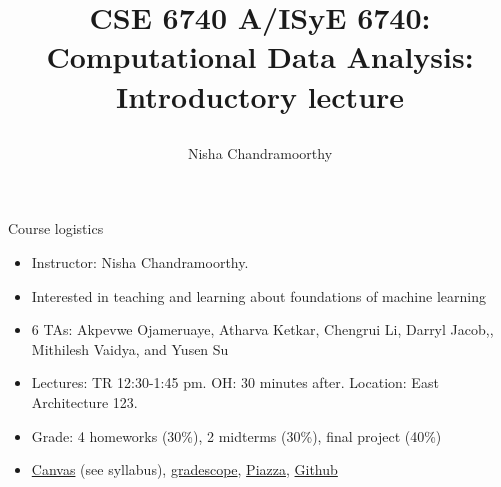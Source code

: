 \documentclass[final]{beamer}
\title{\begin{huge}{CSE 6740 A/ISyE 6740: Computational Data Analysis: Introductory lecture}\end{huge}} %
\author{Nisha Chandramoorthy} %
\begin{document}
\frame{\titlepage}

\begin{frame}{Course logistics}
\begin{itemize}
	\item Instructor: Nisha Chandramoorthy. 
	\pause
	\item Interested in teaching and learning about foundations of machine learning
	\pause
	\item 6 TAs: Akpevwe Ojameruaye, Atharva Ketkar, Chengrui Li, Darryl Jacob,, Mithilesh Vaidya, and Yusen Su 
	\pause
	\item Lectures: TR 12:30-1:45 pm. OH: 30 minutes after. Location: East Architecture 123.
	\pause
	\item Grade: 4 homeworks (30\%), 2 midterms (30\%), final project (40\%)
	\pause
\item \href{https://canvas.gatech.edu}{Canvas} (see syllabus), \href{https://www.gradescope.com/courses/578036}{gradescope}, \href{https://piazza.com/gatech/fall2023/cse6740a/info}{Piazza}, \href{https://github.com/ni-sha-c/CSE-6740-Fall23}{Github}
\end{itemize}
\end{frame}
\end{document}
